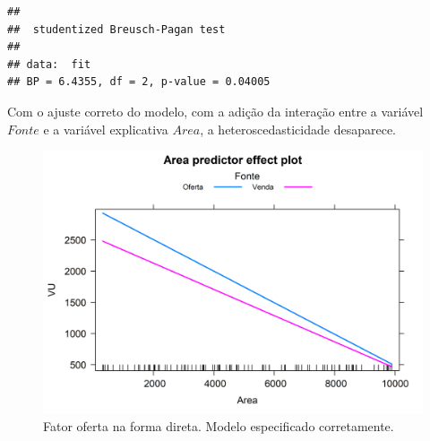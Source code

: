 \documentclass{article}
\begin{document}
\begin{verbatim}
## 
##  studentized Breusch-Pagan test
## 
## data:  fit
## BP = 6.4355, df = 2, p-value = 0.04005
\end{verbatim}

Com o ajuste correto do modelo, com a adição da interação entre a
variável \(Fonte\) e a variável explicativa \(Area\), a
heteroscedasticidade desaparece.

\begin{figure}
\centering
\includegraphics{./images/rightModel-1.png}
\caption{Fator oferta na forma direta. Modelo especificado
corretamente.}
\end{figure}
\end{document}
